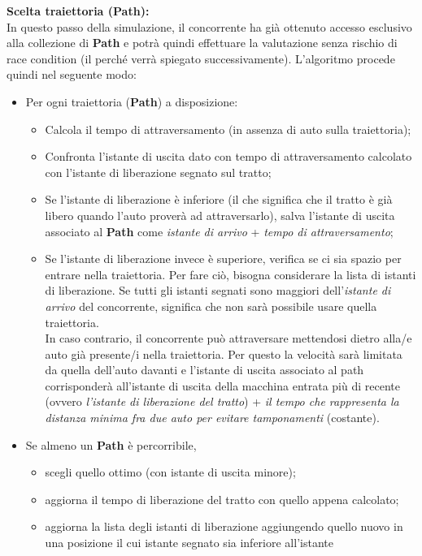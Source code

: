\begin{description}
\item{\textbf{Scelta traiettoria (Path):}}\\
In questo passo della simulazione, il concorrente ha già ottenuto accesso esclusivo alla collezione di \textbf{Path} e potrà quindi
effettuare la valutazione senza rischio di race condition (il perché verrà spiegato successivamente). L'algoritmo procede quindi nel
seguente modo:
\begin{itemize}
\item Per ogni traiettoria (\textbf{Path}) a disposizione:
\begin{itemize}
\item Calcola il tempo di attraversamento (in assenza di auto sulla traiettoria);
\item Confronta l'istante di uscita dato con tempo di attraversamento calcolato con l'istante di liberazione
segnato sul tratto;
\item Se l'istante di liberazione è inferiore (il che significa che il tratto è già libero quando l'auto proverà ad attraversarlo),
salva l'istante di uscita associato al \textbf{Path} come \emph{istante di arrivo} + \emph{tempo di attraversamento};
\item Se l'istante di liberazione invece è superiore, verifica se ci sia spazio per entrare nella traiettoria. Per fare ciò, bisogna considerare
la lista di istanti di liberazione. Se tutti gli istanti segnati sono maggiori dell'\emph{istante di arrivo} del concorrente, significa che 
non sarà possibile usare quella traiettoria.\\
In caso contrario, il concorrente può attraversare mettendosi dietro alla/e auto già presente/i nella traiettoria. Per questo la velocità
sarà limitata da quella dell'auto davanti e l'istante di uscita associato al path 
corrisponderà all'istante di uscita della macchina entrata più di recente (ovvero
\emph{l'istante di liberazione del tratto}) + \emph{il tempo che rappresenta la distanza minima fra due auto per evitare tamponamenti} 
(costante).
\end{itemize}
\item Se almeno un \textbf{Path} è percorribile, 
\begin{itemize}
\item scegli quello ottimo (con istante di uscita minore);
\item aggiorna il tempo di liberazione del tratto con quello appena calcolato;
\item aggiorna la lista degli istanti di liberazione aggiungendo quello nuovo in una posizione il cui istante segnato sia inferiore all'istante

\end{itemize}
\end{itemize}
\end{description}
